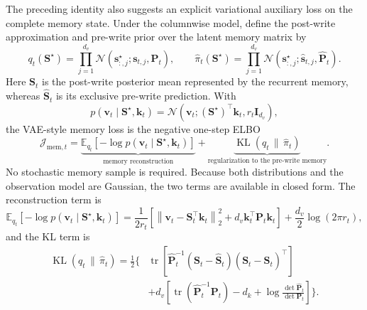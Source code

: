 \documentclass[11pt]{article}
\newcommand{\vct}[1]{\boldsymbol{#1}}
\begin{document}
The preceding identity also suggests an explicit variational auxiliary loss on the complete
memory state. Under the columnwise model, define the post-write approximation and pre-write prior
over the latent memory matrix by
\begin{equation}
  q_t(\vct{S}^{\star})
  =\prod_{j=1}^{d_v}
    \mathcal{N}(\vct{s}^{\star}_{:,j};\vct{s}_{t,j},\vct{P}_t),
  \qquad
  \widehat\pi_t(\vct{S}^{\star})
  =\prod_{j=1}^{d_v}
    \mathcal{N}(\vct{s}^{\star}_{:,j};
      \widehat{\vct{s}}_{t,j},\widehat{\vct{P}}_t).
  \label{eq:discussion-memory-variational-family}
\end{equation}
Here $\vct{S}_t$ is the post-write posterior mean represented by the recurrent memory, whereas
$\widehat{\vct{S}}_t$ is its exclusive pre-write prediction. With
\begin{equation}
  p(\vct{v}_t\mid\vct{S}^{\star},\vct{k}_t)
  =\mathcal{N}\!\left(
    \vct{v}_t;(\vct{S}^{\star})^\top\vct{k}_t,
    r_t\vct{I}_{d_v}
  \right),
  \label{eq:discussion-memory-observation-model}
\end{equation}
the VAE-style memory loss is the negative one-step ELBO
\begin{equation}
  \mathcal{J}_{\mathrm{mem},t}
  =\underbrace{
    \mathbb{E}_{q_t}\!\left[
      -\log p(\vct{v}_t\mid\vct{S}^{\star},\vct{k}_t)
    \right]
  }_{\text{memory reconstruction}}
  +\underbrace{
    \operatorname{KL}\!\left(q_t\,\|\,\widehat\pi_t\right)
  }_{\text{regularization to the pre-write memory}}.
  \label{eq:discussion-memory-vae-loss}
\end{equation}
No stochastic memory sample is required. Because both distributions and the observation model are
Gaussian, the two terms are available in closed form. The reconstruction term is
\begin{equation}
  \mathbb{E}_{q_t}\!\left[
    -\log p(\vct{v}_t\mid\vct{S}^{\star},\vct{k}_t)
  \right]
  =\frac{1}{2r_t}\left[
    \left\|\vct{v}_t-\vct{S}_t^\top\vct{k}_t\right\|_2^2
    +d_v\vct{k}_t^\top\vct{P}_t\vct{k}_t
  \right]
  +\frac{d_v}{2}\log(2\pi r_t),
  \label{eq:discussion-memory-reconstruction-closed-form}
\end{equation}
and the KL term is
\begin{equation}
\begin{aligned}
  \operatorname{KL}(q_t\,\|\,\widehat\pi_t)
  =\frac12\Bigg\{
  &\operatorname{tr}\!\left[
    \widehat{\vct{P}}_t^{-1}
    (\vct{S}_t-\widehat{\vct{S}}_t)
    (\vct{S}_t-\widehat{\vct{S}}_t)^\top
  \right] \\
  &+d_v\left[
    \operatorname{tr}(\widehat{\vct{P}}_t^{-1}\vct{P}_t)
    -d_k
    +\log\frac{\det\widehat{\vct{P}}_t}{\det\vct{P}_t}
  \right]
  \Bigg\}.
\end{aligned}
  \label{eq:discussion-memory-kl-closed-form}
\end{equation}
\end{document}

